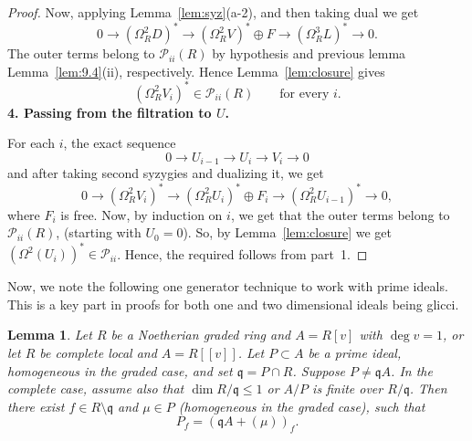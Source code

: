 \documentclass[11pt,letterpaper]{amsart}
\theoremstyle{plain}
\newtheorem{lem}[thm]{Lemma}
\theoremstyle{definition}
\theoremstyle{remark}
\begin{document}
\begin{proof}
Now, applying Lemma~\ref{lem:syz}(a-2), and then taking dual we get 
\[
0\longrightarrow(\Omega_R^2D)^*
\longrightarrow(\Omega_R^2V)^*\oplus F
\longrightarrow(\Omega_R^3L)^*
\longrightarrow0.
\]
The outer terms belong to
$\mathcal P_{ii}(R)$ by hypothesis and previous lemma
Lemma~\ref{lem:9.4}(ii), respectively. Hence
Lemma~\ref{lem:closure} gives
\[
(\Omega_R^2V_i)^*\in\mathcal P_{ii}(R)
\qquad\text{for every }i.
\]
\smallskip
\noindent\textbf{4. Passing from the filtration to $U$.}

For each $i$, the exact sequence \[ 0\longrightarrow U_{i-1} \longrightarrow U_i\longrightarrow V_i \longrightarrow0 \] and after taking second syzygies and dualizing it, we get \[ 0\longrightarrow(\Omega_R^2V_i)^*\longrightarrow(\Omega_R^2U_i)^*\oplus F_i \longrightarrow(\Omega_R^2U_{i-1})^* \longrightarrow0, \]
where $F_i$ is free. Now, by induction on $i$, we get that the outer terms belong to $\mathcal P_{ii}(R)$, (starting with $U_0=0$). So, by Lemma~\ref{lem:closure} we get $(\Omega^2(U_i))^*\in\mathcal{P}_{ii}$. Hence, the required follows from part~1.
\end{proof}

Now, we note the following one generator technique to work with prime ideals. This is a key part in proofs for both one and two dimensional ideals being glicci.


\begin{lem}\label{lem:one-equation}
Let $R$ be a Noetherian graded ring and $A=R[v]$ with
$\deg v=1$, or let $R$ be complete local and $A=R[[v]]$.
Let $P\subset A$ be a prime ideal, homogeneous in the
graded case, and set $\mathfrak q=P\cap R$.
Suppose $P\ne\mathfrak qA$. In the complete case, assume
also that $\dim R/\mathfrak q\leq1$ or $A/P$ is finite
over $R/\mathfrak q$.
Then there exist $f\in R\setminus\mathfrak q$ and
$\mu\in P$ (homogeneous in the graded case), such that
\[
P_f=(\mathfrak qA+(\mu))_f.
\]
\end{lem}
\end{document}
